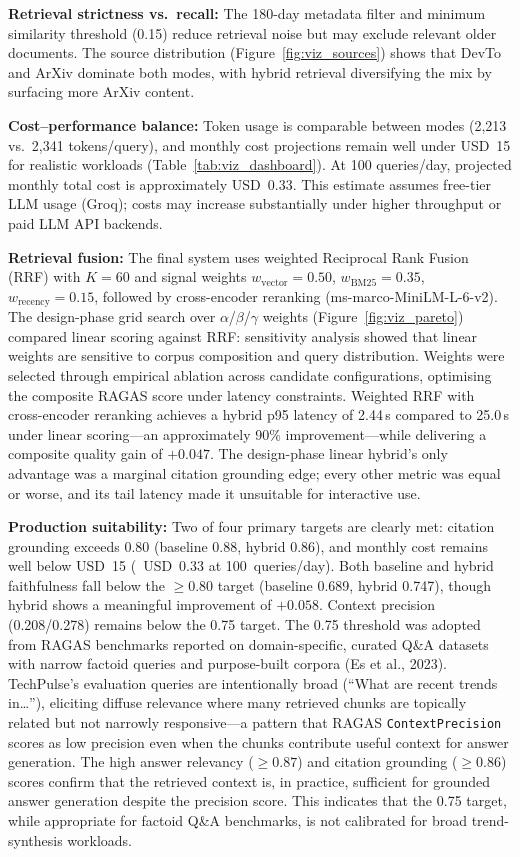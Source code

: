 \textbf{Retrieval strictness vs.\ recall:} The 180-day metadata filter and minimum similarity threshold (0.15) reduce retrieval noise but may exclude relevant older documents. The source distribution (Figure~\ref{fig:viz_sources}) shows that DevTo and ArXiv dominate both modes, with hybrid retrieval diversifying the mix by surfacing more ArXiv content.

\textbf{Cost--performance balance:} Token usage is comparable between modes (2{,}213 vs.\ 2{,}341 tokens/query), and monthly cost projections remain well under USD~15 for realistic workloads (Table~\ref{tab:viz_dashboard}). At 100 queries/day, projected monthly total cost is approximately USD~0.33. This estimate assumes free-tier LLM usage (Groq); costs may increase substantially under higher throughput or paid LLM API backends.

\textbf{Retrieval fusion:} The final system uses weighted Reciprocal Rank Fusion (RRF) with $K = 60$ and signal weights $w_{\text{vector}} = 0.50$, $w_{\text{BM25}} = 0.35$, $w_{\text{recency}} = 0.15$, followed by cross-encoder reranking (ms-marco-MiniLM-L-6-v2). The design-phase grid search over $\alpha$/$\beta$/$\gamma$ weights (Figure~\ref{fig:viz_pareto}) compared linear scoring against RRF: sensitivity analysis showed that linear weights are sensitive to corpus composition and query distribution.  Weights were selected through empirical ablation across candidate configurations, optimising the composite RAGAS score under latency constraints. Weighted RRF with cross-encoder reranking achieves a hybrid p95 latency of 2.44\,s compared to 25.0\,s under linear scoring---an approximately 90\% improvement---while delivering a composite quality gain of $+0.047$. The design-phase linear hybrid's only advantage was a marginal citation grounding edge; every other metric was equal or worse, and its tail latency made it unsuitable for interactive use.

\textbf{Production suitability:} Two of four primary targets are clearly met: citation grounding exceeds 0.80 (baseline 0.88, hybrid 0.86), and monthly cost remains well below USD~15 (~USD~0.33 at 100~queries/day). Both baseline and hybrid faithfulness fall below the $\geq 0.80$ target (baseline 0.689, hybrid 0.747), though hybrid shows a meaningful improvement of $+0.058$. Context precision (0.208/0.278) remains below the 0.75 target. The 0.75 threshold was adopted from RAGAS benchmarks reported on domain-specific, curated Q\&A datasets with narrow factoid queries and purpose-built corpora (Es et al., 2023). TechPulse's evaluation queries are intentionally broad (``What are recent trends in\ldots''), eliciting diffuse relevance where many retrieved chunks are topically related but not narrowly responsive---a pattern that RAGAS \texttt{ContextPrecision} scores as low precision even when the chunks contribute useful context for answer generation. The high answer relevancy ($\geq 0.87$) and citation grounding ($\geq 0.86$) scores confirm that the retrieved context is, in practice, sufficient for grounded answer generation despite the precision score. This indicates that the 0.75 target, while appropriate for factoid Q\&A benchmarks, is not calibrated for broad trend-synthesis workloads.

